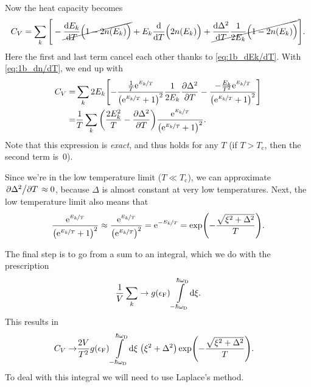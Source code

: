 \documentclass[11pt,letter, swedish, english
]{article}
\newcommand{\Tc}{\ensuremath{T_{\text{c}}}}
\newcommand{\eF}{\ensuremath{\epsilon_{\text{F}}}}
\newcommand{\wD}{\ensuremath{\omega_{\text{D}}}}
\begin{document}
Now the heat capacity becomes
\begin{equation}
C_V=\sum_k\Bigg[
-\cancel{\dv{E_k}{T}\Big(1-2n(E_k)\Big)}
+E_k\dv{T}\Big(2n(E_k)\Big)
+\cancel{\dv{\Delta^2}{T}\frac{1}{2E_k}\Big(1-2n(E_k)\Big)}
\Bigg].
\end{equation}
Here the first and last term cancel each other thanks to
\eqref{eq:1b_dEk/dT}. With \eqref{eq:1b_dn/dT}, we end up with
\begin{equation}\label{eq:1b_Cv_exact}
\begin{aligned}
C_V=&\sum_k2E_k\qty[
-\frac{\frac{1}{T}\mathrm{e}^{\nicefrac{E_k}{T}}}
{\qty(\mathrm{e}^{\nicefrac{E_k}{T}}+1)^2} \frac{1}{2E_k}\pdv{\Delta^2}{T}
-\frac{-\frac{E_k}{T^2}\mathrm{e}^{\nicefrac{E_k}{T}}}
{\qty(\mathrm{e}^{\nicefrac{E_k}{T}}+1)^2} ]\\
=&\frac{1}{T}\sum_k\qty(\frac{2E_k^2}{T}-\pdv{\Delta^2}{T})
\frac{\mathrm{e}^{\nicefrac{E_k}{T}}}{\qty(\mathrm{e}^{\nicefrac{E_k}{T}}+1)^2}.
\end{aligned}
\end{equation}
Note that this expression is \emph{exact}, and thus holds for any $T$ (if
$T>\Tc$, then the second term is~0).

Since we're in the low temperature limit ($T\ll\Tc$), we can
approximate $\pdv*{\Delta^2}{T}\approx0$, 
because ${\Delta}$ is almost constant at very low temperatures. Next,
the low temperature limit also means that
\begin{equation}
\frac{\mathrm{e}^{\nicefrac{E_k}{T}}}{\qty(\mathrm{e}^{\nicefrac{E_k}{T}}+1)^2}
\approx
\frac{\mathrm{e}^{\nicefrac{E_k}{T}}}{\qty(\mathrm{e}^{\nicefrac{E_k}{T}})^2}
=\mathrm{e}^{-\nicefrac{E_k}{T}}
=\exp(-\frac{\sqrt{\xi^2+\Delta^2}}{T}).
\end{equation}

The final step is to go from a sum to an integral, which we do with
the prescription
\begin{equation}\label{eq:1_sum_int}
\frac{1}{V}\sum_k \to g(\eF)\int_{-\hbar\wD}^{\hbar\wD}\!\rd\xi.
\end{equation}
This results in
\begin{equation}
\begin{aligned}
C_V\to&\frac{2V}{T^2}g(\eF)\int_{-\hbar\wD}^{\hbar\wD}\!\rd\xi\;
\qty(\xi^2+\Delta^2)\exp(-\frac{\sqrt{\xi^2+\Delta^2}}{T}).
\end{aligned}
\end{equation}
To deal with this integral we will need to use Laplace's method.
\end{document}
